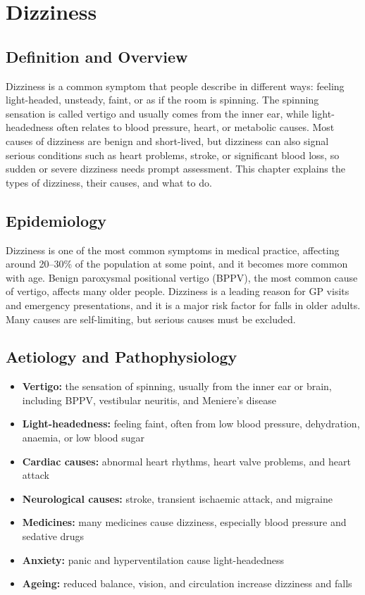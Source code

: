 \chapter{Dizziness}

\section*{Definition and Overview}
Dizziness is a common symptom that people describe in different ways: feeling light-headed, unsteady, faint, or as if the room is spinning. The spinning sensation is called vertigo and usually comes from the inner ear, while light-headedness often relates to blood pressure, heart, or metabolic causes. Most causes of dizziness are benign and short-lived, but dizziness can also signal serious conditions such as heart problems, stroke, or significant blood loss, so sudden or severe dizziness needs prompt assessment. This chapter explains the types of dizziness, their causes, and what to do.

\section*{Epidemiology}
Dizziness is one of the most common symptoms in medical practice, affecting around 20--30\% of the population at some point, and it becomes more common with age. Benign paroxysmal positional vertigo (BPPV), the most common cause of vertigo, affects many older people. Dizziness is a leading reason for GP visits and emergency presentations, and it is a major risk factor for falls in older adults. Many causes are self-limiting, but serious causes must be excluded.

\section*{Aetiology and Pathophysiology}
\begin{itemize}
    \item \textbf{Vertigo:} the sensation of spinning, usually from the inner ear or brain, including BPPV, vestibular neuritis, and Meniere's disease
    \item \textbf{Light-headedness:} feeling faint, often from low blood pressure, dehydration, anaemia, or low blood sugar
    \item \textbf{Cardiac causes:} abnormal heart rhythms, heart valve problems, and heart attack
    \item \textbf{Neurological causes:} stroke, transient ischaemic attack, and migraine
    \item \textbf{Medicines:} many medicines cause dizziness, especially blood pressure and sedative drugs
    \item \textbf{Anxiety:} panic and hyperventilation cause light-headedness
    \item \textbf{Ageing:} reduced balance, vision, and circulation increase dizziness and falls
\end{itemize}

